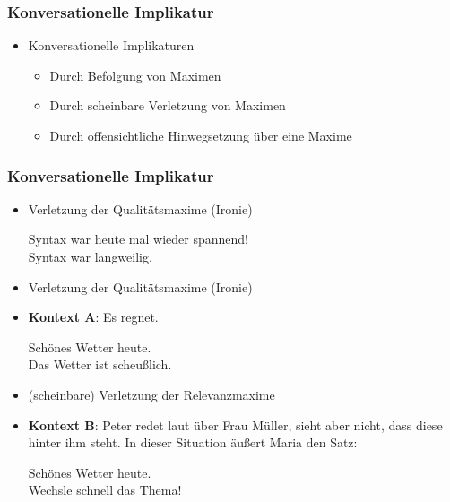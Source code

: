 \begin{frame}
\frametitle{Konversationelle Implikatur}

\begin{itemize}
	\item Konversationelle Implikaturen
	
\vspace{5mm}
	
	\begin{itemize}
		\item Durch Befolgung von Maximen
		\medskip
		\item Durch scheinbare Verletzung von Maximen
		\medskip
		\item Durch offensichtliche Hinwegsetzung über eine Maxime
	\end{itemize}
	
\end{itemize}

\end{frame}




\begin{frame}
\frametitle{Konversationelle Implikatur}

\begin{itemize}

	\item Verletzung der Qualitätsmaxime (Ironie)

	\ea Syntax war heute mal wieder spannend!\\
	\implc Syntax war langweilig.
	\z

\medskip

	\item Verletzung der Qualitätsmaxime (Ironie)
	
	\item[] \textbf{Kontext A}: Es regnet.
	
	\ea Schönes Wetter heute.\\
	\implc Das Wetter ist scheu\ss{}lich.
	\z
	
\medskip	
	
	\item (scheinbare) Verletzung der Relevanzmaxime
	
	\item[] \textbf{Kontext B}: Peter redet laut über Frau Müller, sieht aber nicht, dass diese hinter ihm steht. In dieser Situation äu\ss{}ert Maria den Satz:
	
	\ea Schönes Wetter heute.\\
	\implc Wechsle schnell das Thema! 
	\z	
		
	\end{itemize}

\end{frame}


